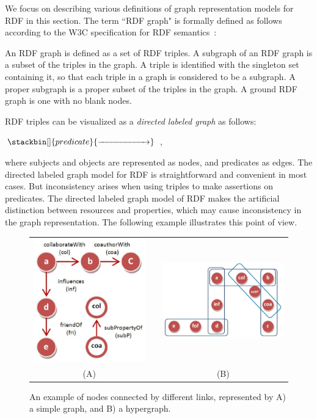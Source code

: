 We focus on describing various definitions of graph representation models for RDF in this section. The term ``RDF graph" is formally defined as follows according to the W3C specification for RDF semantics~\cite{Hayes_rdf2004}:

\begin{mydef}
An RDF graph is defined as a set of RDF triples. A subgraph of an RDF graph is a subset of the triples in the graph. A triple is identified with the singleton set containing it, so that each triple in a graph is considered to be a subgraph. A proper subgraph is a proper subset of the triples in the graph. A ground RDF graph is one with no blank nodes.
\end{mydef}

RDF triples can be visualized as a \emph{directed labeled graph} as follows:
\begin{center} $\stackbin[]{predicate}{\xrightarrow{\hspace*{2cm}}}$ \;,\end{center}
where subjects and objects are represented as nodes, and predicates as edges. The directed labeled graph model for RDF is straightforward and convenient in most cases. But inconsistency arises when using triples to make assertions on predicates. The directed labeled graph model of RDF makes the artificial distinction between resources and properties, which may cause inconsistency in the graph representation. The following example illustrates this point of view.

\begin{figure}[tbh]
\begin{center}
\begin{tabular}{ccc}
\includegraphics[width=.25\textwidth]{fig/reg_graph.eps} & &
\includegraphics[width=.43\textwidth]{fig/hypergraph.eps}\\
(A) & & (B)\\
\end{tabular}
\end{center}
\caption[A comparison between a simple graph and a hypergraph]{\label{fig:graphcomp} An example of nodes connected by different links, represented by A) a simple graph, and B) a hypergraph.}
\end{figure}

